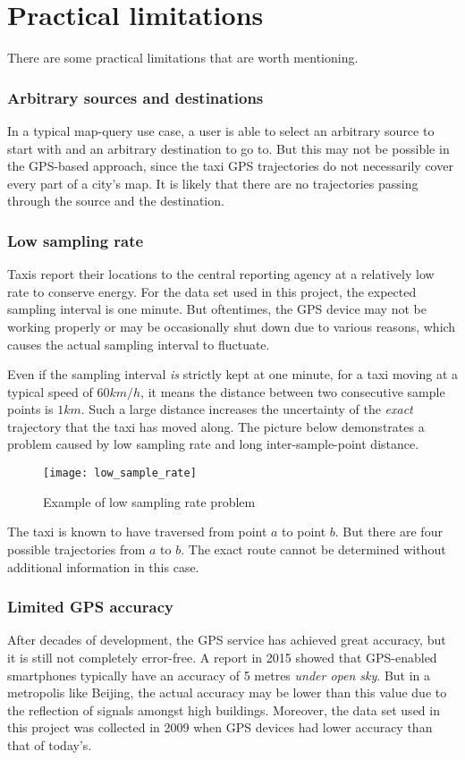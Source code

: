 \section{Practical limitations}
There are some practical limitations that are worth mentioning. 
\subsubsection{Arbitrary sources and destinations}
In a typical map-query use case, a user is able to select an arbitrary source to start with and an arbitrary destination to go to. But this may not be possible in the GPS-based approach, since the taxi GPS trajectories do not necessarily cover every part of a city's map. It is likely that there are no trajectories passing through the source and the destination.
\subsubsection{Low sampling rate}
Taxis report their locations to the central reporting agency at a relatively low rate to conserve energy. For the data set used in this project, the expected sampling interval is one minute. But oftentimes, the GPS device may not be working properly or may be occasionally shut down due to various reasons, which causes the actual sampling interval to fluctuate. 

Even if the sampling interval \emph{is} strictly kept at one minute, for a taxi moving at a typical speed of $60km/h$, it means the distance between two consecutive sample points is $1km$. Such a large distance increases the uncertainty of the \emph{exact} trajectory that the taxi has moved along. The picture\cite{TDR10} below demonstrates a problem caused by low sampling rate and long inter-sample-point distance.
\begin{figure}[h]
\texttt{[image: low\_sample\_rate]}
\centering
\caption{Example of low sampling rate problem}
\end{figure}

The taxi is known to have traversed from point $a$ to point $b$. But there are four possible trajectories from $a$ to $b$. The exact route cannot be determined without additional information in this case.
\subsubsection{Limited GPS accuracy}
After decades of development, the GPS service has achieved great accuracy, but it is still not completely error-free. A report\cite{FP15} in 2015 showed that GPS-enabled smartphones typically have an accuracy of 5 metres \emph{under open sky}. But in a metropolis like Beijing, the actual accuracy may be lower than this value due to the reflection of signals amongst high buildings. Moreover, the data set used in this project was collected in 2009 when GPS devices had lower accuracy than that of today's.

